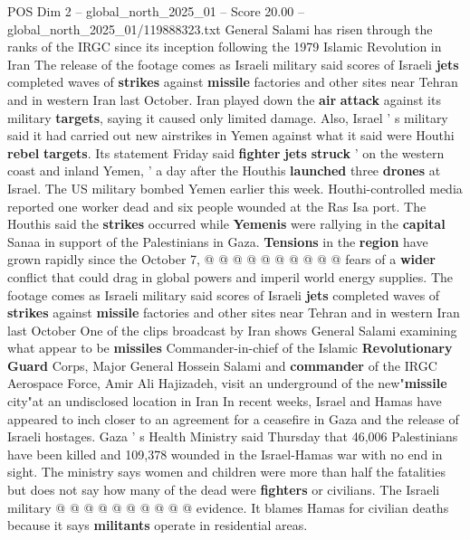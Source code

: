 \begin{textsample}{POS Dim 2 – global\_north\_2025\_01 – Score 20.00 – global\_north\_2025\_01/119888323.txt}  \label{ex:f2_pos_396}
General Salami has risen through the ranks of the IRGC since its inception following the 1979 Islamic Revolution in Iran The release of the footage comes as Israeli military said scores of Israeli \textbf{jets} completed waves of \textbf{strikes} against \textbf{missile} factories and other sites near Tehran and in western Iran last October.
Iran played down the \textbf{air} \textbf{attack} against its military \textbf{targets}, saying it caused only limited damage.
Also, Israel ' s military said it had carried out new airstrikes in Yemen against what it said were Houthi \textbf{rebel} \textbf{targets}.
Its statement Friday said \textbf{fighter} \textbf{jets} \textbf{struck} ' on the western coast and inland Yemen, ' a day after the Houthis \textbf{launched} three \textbf{drones} at Israel.
The US military bombed Yemen earlier this week.
Houthi-controlled media reported one worker dead and six people wounded at the Ras Isa port.
The Houthis said the \textbf{strikes} occurred while \textbf{Yemenis} were rallying in the \textbf{capital} Sanaa in support of the Palestinians in Gaza. \textbf{Tensions} in the \textbf{region} have grown rapidly since the October 7, @ @ @ @ @ @ @ @ @ @ fears of a \textbf{wider} conflict that could drag in global powers and imperil world energy supplies.
The footage comes as Israeli military said scores of Israeli \textbf{jets} completed waves of \textbf{strikes} against \textbf{missile} factories and other sites near Tehran and in western Iran last October One of the clips broadcast by Iran shows General Salami examining what appear to be \textbf{missiles} Commander-in-chief of the Islamic \textbf{Revolutionary} \textbf{Guard} Corps, Major General Hossein Salami and \textbf{commander} of the IRGC Aerospace Force, Amir Ali Hajizadeh, visit an underground of the new"\textbf{missile} city"at an undisclosed location in Iran In recent weeks, Israel and Hamas have appeared to inch closer to an agreement for a ceasefire in Gaza and the release of Israeli hostages.
Gaza ' s Health Ministry said Thursday that 46,006 Palestinians have been killed and 109,378 wounded in the Israel-Hamas war with no end in sight.
The ministry says women and children were more than half the fatalities but does not say how many of the dead were \textbf{fighters} or civilians.
The Israeli military @ @ @ @ @ @ @ @ @ @ evidence.
It blames Hamas for civilian deaths because it says \textbf{militants} operate in residential areas.

\end{textsample}
